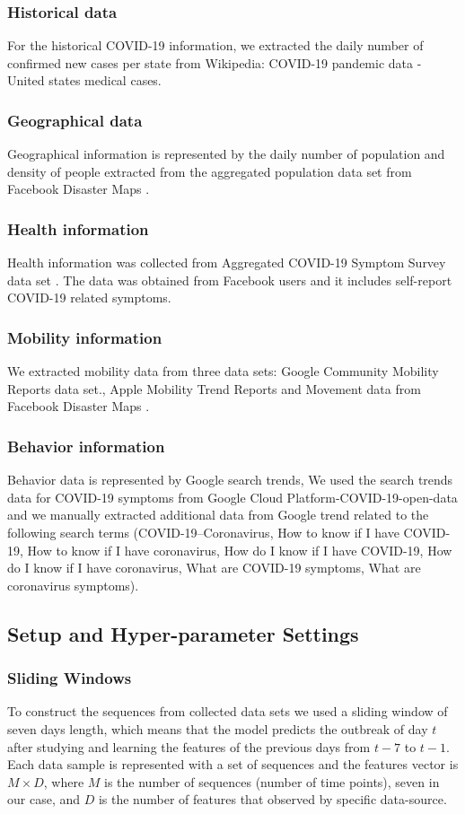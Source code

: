 \documentclass[conference]{IEEEtran}
\begin{document}
\subsubsection{Historical data}
For the historical COVID-19 information, we extracted the daily number of confirmed new cases per state from Wikipedia: COVID-19 pandemic data - United states medical cases.
\subsubsection{Geographical data}
Geographical information is represented by the daily number of population and density of people extracted from the aggregated population data set from Facebook Disaster Maps \cite{maas2019facebook}.
\subsubsection{Health information}
Health information was collected from Aggregated COVID-19 Symptom Survey data set \cite{kreuter2020partnering}. The data was obtained from  Facebook users and it includes self-report COVID-19 related symptoms.
\subsubsection{Mobility information}
We extracted mobility data from three data sets: Google Community Mobility Reports data set., Apple Mobility Trend Reports and Movement data from Facebook Disaster Maps \cite{maas2019facebook}.
\subsubsection{Behavior information}
Behavior data is represented by Google search trends, We used the search trends data for COVID-19 symptoms from Google Cloud Platform-COVID-19-open-data and we manually extracted additional data from Google trend related to the following search terms (COVID-19–Coronavirus, How to know if I have COVID-19, How to know if I have coronavirus, How do I know if I have COVID-19, How do I know if I have coronavirus, What are COVID-19 symptoms, What are coronavirus symptoms). 

\subsection{Setup and Hyper-parameter Settings}
\subsubsection {Sliding Windows}
To construct the sequences from collected data sets we used a sliding window of seven days length, which means that the model predicts the outbreak of day $t$ after studying and learning the features of the previous days from $t-7$ to $t-1$. Each data sample is represented with a set of sequences and the features vector is $M \times D$, where $M$ is the number of sequences (number of time points), seven in our case, and $D$ is the number of features that observed by specific data-source.
\end{document}
